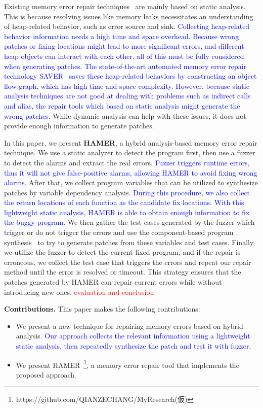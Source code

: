 \documentclass[a4paper,11pt,oneside,openany]{book}
\begin{document}
Existing memory error repair techniques~\cite{SAVER,Memfix} are mainly based on static analysis. This is because resolving issues like memory leaks necessitates an understanding of heap-related behavior, such as error source and sink. \textcolor{blue}{Collecting heap-related behavior information needs a high time and space overhead. Because wrong patches or fixing locations might lead to more significant errors, and different heap objects can interact with each other, all of this must be fully considered when generating patches. The state-of-the-art automated memory error repair technology SAVER~\cite{SAVER} saves these heap-related behaviors by constructing an object flow graph, which has high time and space complexity. However, because static analysis techniques are not good at dealing with problems such as indirect calls and alias, the repair tools which based on static analysis might generate the wrong patches.} While dynamic analysis can help with these issues, it does not provide enough information to generate patches.

In this paper, we present \textbf{HAMER}, a hybrid analysis-based memory error repair \mbox{technique}. We use a static analyzer to detect the program first, then use a fuzzer to detect the alarms and extract the real errors. \textcolor{blue}{Fuzzer triggers runtime errors, thus it will not give false-positive alarms, allowing HAMER to avoid fixing wrong alarms.} After that, we collect program variables that can be utilized to synthesize patches by variable dependency analysis. \textcolor{blue}{During this procedure, we also collect the return locations of each function as the candidate fix locations. With this lightweight static analysis, HAMER is able to obtain enough information to fix the buggy program.} We then gather the test cases generated by the fuzzer which trigger or do not trigger the errors and use the component-based program synthesis~\cite{oracle} to try to generate patches from these variables and test cases. Finally, we utilize the fuzzer to detect the current fixed program, and if the repair is erroneous, we collect the test case that triggers the errors and repeat our repair method until the error is resolved or timeout. This strategy ensures that the patches generated by HAMER can repair current errors while without introducing new ones. \textcolor{red}{evaluation and conclusion}

\textbf{Contributions.} This paper makes the following contributions:
\begin{itemize}
  \item We present a new technique for repairing memory errors based on hybrid analysis. \textcolor{blue}{Our approach collects the relevant information using a lightweight static analysis, then repeatedly synthesize the patch and test it with fuzzer.}
  \item We present HAMER~\footnote{https://github.com/QIANZECHANG/MyResearch(仮)}, a memory error repair tool that implements the proposed approach.
\end{itemize}
\end{document}

